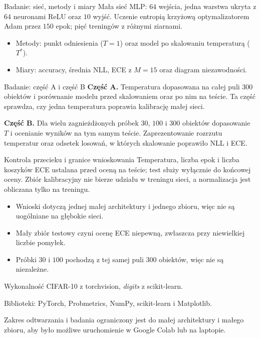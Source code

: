 \documentclass[aspectratio=169,professionalfonts,t]{beamer}
\begin{document}
\begin{frame}{Badanie: sieć, metody i miary}
  Mała sieć MLP: $64$ wejścia, jedna warstwa ukryta z $64$ neuronami ReLU oraz $10$ wyjść.
  Uczenie entropią krzyżową optymalizatorem Adam przez $150$ epok; pięć treningów z różnymi ziarnami.
  \begin{itemize}
    \item Metody: punkt odniesienia ($T=1$) oraz model po skalowaniu temperaturą ($T^\ast$).
    \item Miary: accuracy, średnia NLL, ECE z $M=15$ oraz diagram niezawodności.
  \end{itemize}
\end{frame}

\begin{frame}{Badanie: część A i część B}
  \textbf{Część A.} Temperatura dopasowana na całej puli $300$ obiektów i porównanie modelu przed skalowaniem oraz po nim na teście.
  Ta część sprawdza, czy jedna temperatura poprawia kalibrację małej sieci.

  \vspace{0.5em}
  \textbf{Część B.} Dla wielu zagnieżdżonych próbek $30$, $100$ i $300$ obiektów dopasowanie $T$ i ocenianie wyników na tym samym teście.
  Zaprezentowanie rozrzutu temperatur oraz odsetek losowań, w których skalowanie poprawiło NLL i ECE.
\end{frame}

\begin{frame}{Kontrola przecieku i granice wnioskowania}
  Temperatura, liczba epok i liczba koszyków ECE ustalana przed oceną na teście; test służy wyłącznie do końcowej oceny.
  Zbiór kalibracyjny nie bierze udziału w treningu sieci, a normalizacja jest obliczana tylko na treningu.
  \begin{itemize}
    \item Wnioski dotyczą jednej małej architektury i jednego zbioru, więc nie są uogólniane na głębokie sieci.
    \item Mały zbiór testowy czyni ocenę ECE niepewną, zwłaszcza przy niewielkiej liczbie pomyłek.
    \item Próbki $30$ i $100$ pochodzą z tej samej puli $300$ obiektów, więc nie są niezależne.
  \end{itemize}
\end{frame}

\begin{frame}{Wykonalność}
  CIFAR-10 z torchvision, \emph{digits} z scikit-learn.
  
  \vspace{0.5em}
  Biblioteki: PyTorch, Probmetrics, NumPy, scikit-learn i Matplotlib.
  
  \vspace{0.5em}
  Zakres odtwarzania i badania ograniczony jest do małej architektury i małego zbioru, aby było możliwe uruchomienie w Google Colab lub na laptopie.
\end{frame}
\end{document}
